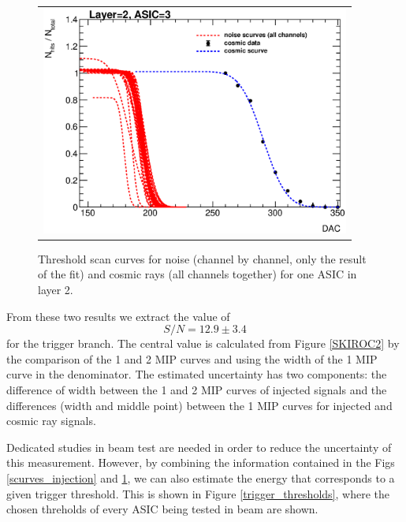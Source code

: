 \documentclass[a4paper,11pt]{article}
\begin{document}
\begin{figure}[!ht]
    \centering
  \begin{tabular}{l}
	\includegraphics[width=4in]{../figs/commissioning/cosmic_scurves_asic3_layer2.eps} 
	\end{tabular}
\caption{Threshold scan curves for noise (channel by channel, only the result of the fit) and cosmic rays (all channels together) for one ASIC in layer 2.}
\label{scurves_cosmics}
\end{figure}

From these two results we extract the value of
\begin{equation}
  S/N=12.9\pm3.4
\end{equation}
for the trigger branch. The central value is calculated from Figure \ref{SKIROC2} by
the comparison of the 1 and 2 MIP curves and using the width of the 1 MIP curve in the denominator. The estimated
uncertainty has two components: the difference of width between the 1 and 2 MIP curves of injected signals and the differences (width and middle point) between the 1 MIP curves for injected and
cosmic ray signals.

Dedicated studies in beam test are needed in order to
reduce the uncertainty of this measurement.
However, by combining the information contained in the Figs \ref{scurves_injection} and \ref{scurves_cosmics}, we can also estimate the energy that corresponds
to a given trigger threshold.
This is shown in Figure \ref{trigger_thresholds}, where the chosen threholds of every ASIC being tested
in beam are shown.
\end{document}
